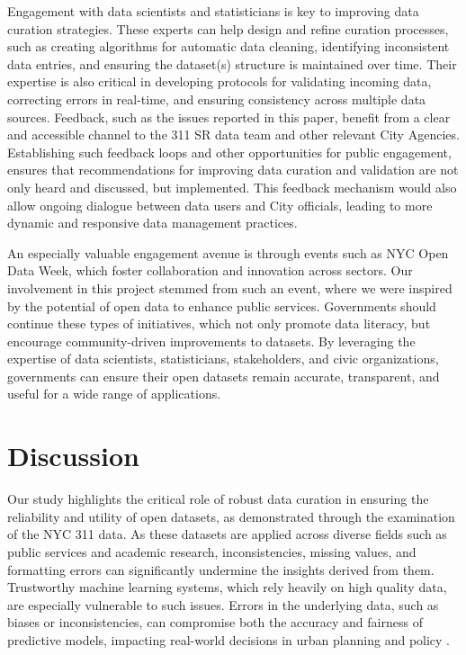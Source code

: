 \documentclass[linenumber]{jdsart}
\begin{document}
Engagement with data scientists and statisticians is key to improving 
data curation strategies. These experts can help design and refine 
curation processes, such as creating algorithms for automatic data 
cleaning, identifying inconsistent data entries, and ensuring the 
dataset(s) structure is maintained over time. Their expertise is also 
critical in developing protocols for validating incoming data, correcting 
errors in real-time, and ensuring consistency across multiple data sources. 
Feedback, such as the issues reported 
in this paper, benefit from a clear and accessible channel to the 311 SR data 
team and other relevant City Agencies. Establishing such feedback loops 
and other opportunities for public engagement, ensures that 
recommendations for improving data curation and validation 
are not only heard and discussed, but implemented. This feedback 
mechanism would also allow ongoing dialogue between 
data users and City officials, leading to more dynamic 
and responsive data management practices.


An especially valuable engagement avenue is through events such as NYC 
Open Data Week, which foster collaboration and innovation across sectors. 
Our involvement in this project stemmed from such an event, where we were 
inspired by the potential of open data to enhance public services. Governments 
should continue these types of initiatives, which not only promote 
data literacy, but encourage community-driven improvements to datasets. 
By leveraging the expertise of data scientists, statisticians, stakeholders, 
and civic organizations, governments can ensure their open datasets 
remain accurate, transparent, and useful for a wide range of applications.


\section{Discussion} 
\label{sec:discussion}
Our study highlights the critical role of robust data curation in
ensuring the reliability and utility of open datasets, as demonstrated
through the examination of the NYC 311 data. As these datasets are
applied across diverse fields such as public services and academic
research, inconsistencies, missing values, and formatting errors can
significantly undermine the insights derived from them. Trustworthy
machine learning systems, which rely heavily on high quality data, are
especially vulnerable to such issues. Errors in the underlying data,
such as biases or inconsistencies, can compromise both the accuracy
and fairness of predictive models, impacting real-world decisions in
urban planning and policy \citep{rahm2000data, geiger2020garbage}.
\end{document}

